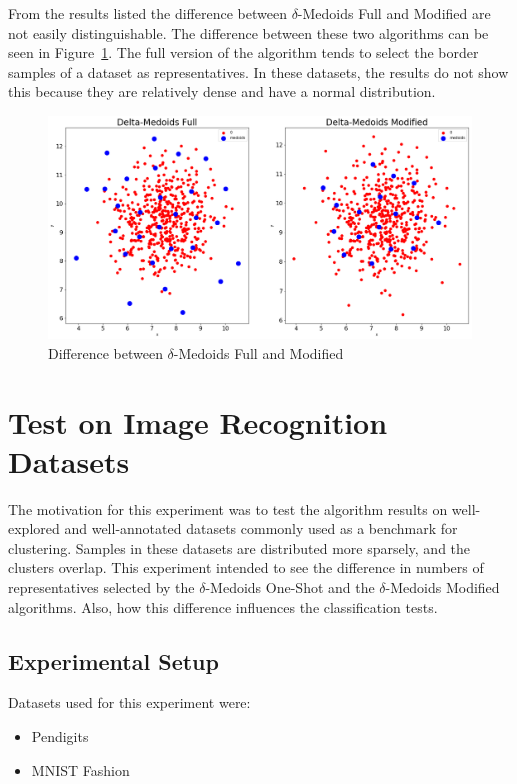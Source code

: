 \documentclass[thesis=B,english]{FITthesis}[2012/10/20]
\begin{document}
From the results listed the difference between $\delta$-Medoids Full and Modified are not easily distinguishable.
The difference between these two algorithms can be seen in Figure~\ref{img:difference_modified}.
The full version of the algorithm tends to select the border samples of a dataset as representatives.
In these datasets, the results do not show this because they are relatively dense and have a normal distribution.

\begin{figure}[H]
   \includegraphics[width=\linewidth]{img/delta_medoids_select.png}
  \caption{Difference between $\delta$-Medoids Full and Modified}
  \label{img:difference_modified}
\end{figure}

\newpage

\section{Test on Image Recognition Datasets}\label{sec:exp3}


The motivation for this experiment was to test the algorithm results on well-explored and well-annotated datasets commonly used as a benchmark for clustering.
Samples in these datasets are distributed more sparsely, and the clusters overlap.
This experiment intended to see the difference in numbers of representatives selected by the $\delta$-Medoids One-Shot and the $\delta$-Medoids Modified algorithms.
Also,  how this difference influences the classification tests.

\subsection{Experimental Setup}
Datasets used for this experiment were:
\begin{itemize}
    \item Pendigits
    \item MNIST Fashion
\end{itemize}
\end{document}
